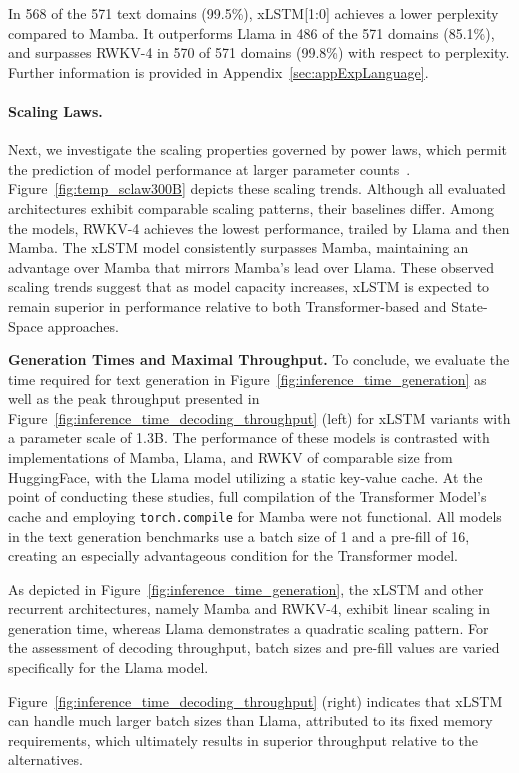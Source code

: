 In 568 of the 571 text domains (99.5\%), xLSTM[1:0] achieves a lower perplexity compared to Mamba. It outperforms Llama in 486 of the 571 domains (85.1\%), and surpasses RWKV-4 in 570 of 571 domains (99.8\%) with respect to perplexity. Further information is provided in Appendix~\ref{sec:appExpLanguage}.

\paragraph{Scaling Laws.} Next, we investigate the scaling properties governed by power laws, which permit the prediction of model performance at larger parameter counts~\citep{Kaplan:20,Brown:20short}. Figure~\ref{fig:temp_sclaw300B} depicts these scaling trends. Although all evaluated architectures exhibit comparable scaling patterns, their baselines differ. Among the models, RWKV-4 achieves the lowest performance, trailed by Llama and then Mamba. The xLSTM model consistently surpasses Mamba, maintaining an advantage over Mamba that mirrors Mamba’s lead over Llama. These observed scaling trends suggest that as model capacity increases, xLSTM is expected to remain superior in performance relative to both Transformer-based and State-Space approaches.

\textbf{Generation Times and Maximal Throughput.} To conclude, we evaluate the time required for text generation in Figure~\ref{fig:inference_time_generation} as well as the peak throughput presented in Figure~\ref{fig:inference_time_decoding_throughput} (left) for xLSTM variants with a parameter scale of 1.3B. The performance of these models is contrasted with implementations of Mamba, Llama, and RWKV of comparable size from HuggingFace, with the Llama model utilizing a static key-value cache. At the point of conducting these studies, full compilation of the Transformer Model's cache and employing \texttt{torch.compile} for Mamba were not functional. All models in the text generation benchmarks use a batch size of 1 and a pre-fill of 16, creating an especially advantageous condition for the Transformer model.

As depicted in Figure~\ref{fig:inference_time_generation}, the xLSTM and other recurrent architectures, namely Mamba and RWKV-4, exhibit linear scaling in generation time, whereas Llama demonstrates a quadratic scaling pattern. For the assessment of decoding throughput, batch sizes and pre-fill values are varied specifically for the Llama model.

Figure~\ref{fig:inference_time_decoding_throughput} (right) indicates that xLSTM can handle much larger batch sizes than Llama, attributed to its fixed memory requirements, which ultimately results in superior throughput relative to the alternatives.

